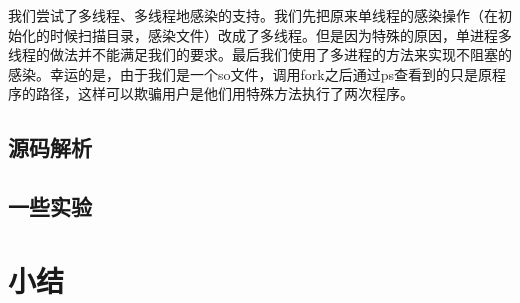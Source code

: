 \documentclass[a4paper, 11pt]{article}
\begin{document}
我们尝试了多线程、多线程地感染的支持。我们先把原来单线程的感染操作（在初始化的时候扫描目录，感染文件）改成了多线程。但是因为特殊的原因，单进程多线程的做法并不能满足我们的要求。最后我们使用了多进程的方法来实现不阻塞的感染。幸运的是，由于我们是一个so文件，调用fork之后通过ps查看到的只是原程序的路径，这样可以欺骗用户是他们用特殊方法执行了两次程序。

\subsection{源码解析}

\subsection{一些实验}
\section{小结}
\end{document}
